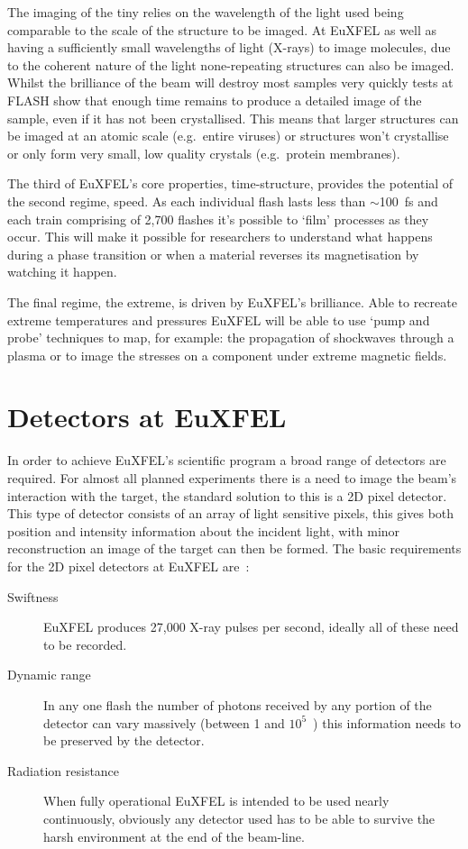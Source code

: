 The imaging of the tiny relies on the wavelength of the light used being comparable to the scale of the structure to be imaged. At EuXFEL as well as having a sufficiently small wavelengths of light (X-rays) to image molecules, due to the coherent nature of the light none-repeating structures can also be imaged. Whilst the brilliance of the beam will destroy most samples very quickly tests at FLASH show that enough time remains to produce a detailed image of the sample, even if it has not been crystallised. This means that larger structures can be imaged at an atomic scale (e.g.\ entire viruses) or structures won't crystallise or only form very small, low quality crystals (e.g.\ protein membranes).

The third of EuXFEL's core properties, time-structure, provides the potential of the second regime, speed. As each individual flash lasts less than \( \sim \)100~fs and each train comprising of 2,700 flashes it's possible to `film' processes as they occur. This will make it possible for researchers to understand what happens during a phase transition or when a material reverses its magnetisation by watching it happen.

The final regime, the extreme, is driven by EuXFEL's brilliance. Able to recreate extreme temperatures and pressures EuXFEL will be able to use `pump and probe' techniques to map, for example: the propagation of shockwaves through a plasma or to image the stresses on a component under extreme magnetic fields.
\section{Detectors at EuXFEL} %
\label{sub:detectors_at_euxfel}
In order to achieve EuXFEL's scientific program a broad range of detectors are required. For almost all planned experiments there is a need to image the beam's interaction with the target, the standard solution to this is a 2D pixel detector. This type of detector consists of an array of light sensitive pixels, this gives both position and intensity information about the incident light, with minor reconstruction an image of the target can then be formed. The basic requirements for the 2D pixel detectors at EuXFEL are~\cite{xfel_website}:
\begin{description}
    \item[Swiftness] EuXFEL produces 27,000 X-ray pulses per second, ideally all of these need to be recorded.
    \item[Dynamic range] In any one flash the number of photons received by any portion of the detector can vary massively (between 1 and \(10^5\)~\cite{lpd_manual}) this information needs to be preserved by the detector.
    \item[Radiation resistance] When fully operational EuXFEL is intended to be used nearly continuously, obviously any detector used has to be able to survive the harsh environment at the end of the beam-line.
\end{description}

